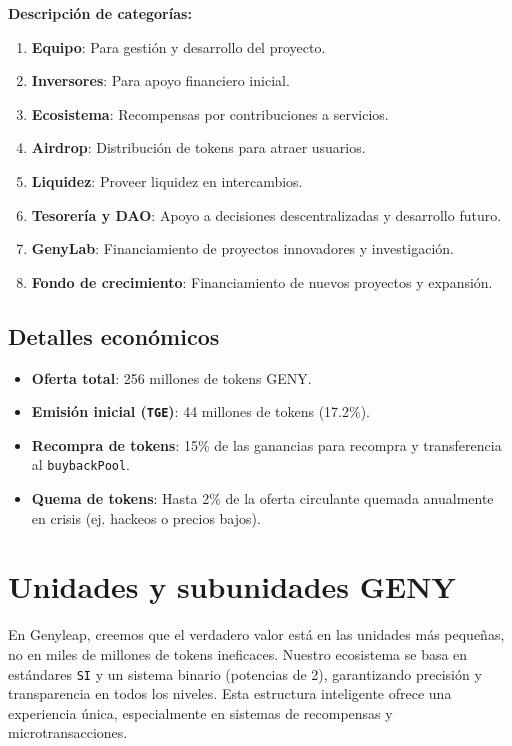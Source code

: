 \documentclass[a4paper,12pt,openany]{book}
\begin{document}
\textbf{Descripción de categorías:}
\begin{enumerate}
    \item \textbf{Equipo}: Para gestión y desarrollo del proyecto.
    \item \textbf{Inversores}: Para apoyo financiero inicial.
    \item \textbf{Ecosistema}: Recompensas por contribuciones a servicios.
    \item \textbf{Airdrop}: Distribución de tokens para atraer usuarios.
    \item \textbf{Liquidez}: Proveer liquidez en intercambios.
    \item \textbf{Tesorería y DAO}: Apoyo a decisiones descentralizadas y desarrollo futuro.
    \item \textbf{GenyLab}: Financiamiento de proyectos innovadores y investigación.
    \item \textbf{Fondo de crecimiento}: Financiamiento de nuevos proyectos y expansión.
\end{enumerate}

\subsection*{Detalles económicos}
\begin{itemize}
    \item \textbf{Oferta total}: 256 millones de tokens GENY.
    \item \textbf{Emisión inicial (\texttt{TGE})}: 44 millones de tokens (17.2\%).
    \item \textbf{Recompra de tokens}: 15\% de las ganancias para recompra y transferencia al \texttt{buybackPool}.
    \item \textbf{Quema de tokens}: Hasta 2\% de la oferta circulante quemada anualmente en crisis (ej. hackeos o precios bajos).
\end{itemize}
\newpage

\section*{Unidades y subunidades GENY}
En Genyleap, creemos que el verdadero valor está en las unidades más pequeñas, no en miles de millones de tokens ineficaces. Nuestro ecosistema se basa en estándares \texttt{SI} y un sistema binario (potencias de 2), garantizando precisión y transparencia en todos los niveles. Esta estructura inteligente ofrece una experiencia única, especialmente en sistemas de recompensas y microtransacciones.
\end{document}
